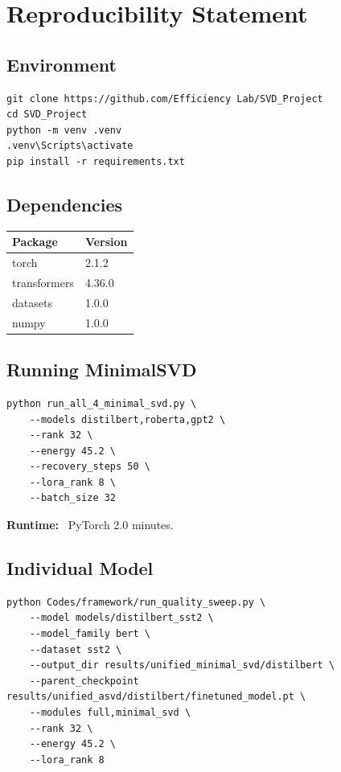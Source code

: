 
\section{Reproducibility Statement}

\subsection{Environment}

\begin{lstlisting}
git clone https://github.com/Efficiency Lab/SVD_Project
cd SVD_Project
python -m venv .venv
.venv\Scripts\activate
pip install -r requirements.txt
\end{lstlisting}

\subsection{Dependencies}

\begin{table}[H]
\centering
\small
\begin{tabular}{ll}
\toprule
\textbf{Package} & \textbf{Version} \\
\midrule
torch & 2.1.2 \\
transformers & 4.36.0 \\
datasets & 1.0.0 \\
numpy & 1.0.0 \\
\bottomrule
\end{tabular}
\end{table}

\subsection{Running MinimalSVD}

\begin{lstlisting}
python run_all_4_minimal_svd.py \
    --models distilbert,roberta,gpt2 \
    --rank 32 \
    --energy 45.2 \
    --recovery_steps 50 \
    --lora_rank 8 \
    --batch_size 32
\end{lstlisting}

\textbf{Runtime:} ~PyTorch 2.0 minutes.

\subsection{Individual Model}

\begin{lstlisting}
python Codes/framework/run_quality_sweep.py \
    --model models/distilbert_sst2 \
    --model_family bert \
    --dataset sst2 \
    --output_dir results/unified_minimal_svd/distilbert \
    --parent_checkpoint results/unified_asvd/distilbert/finetuned_model.pt \
    --modules full,minimal_svd \
    --rank 32 \
    --energy 45.2 \
    --lora_rank 8
\end{lstlisting}

